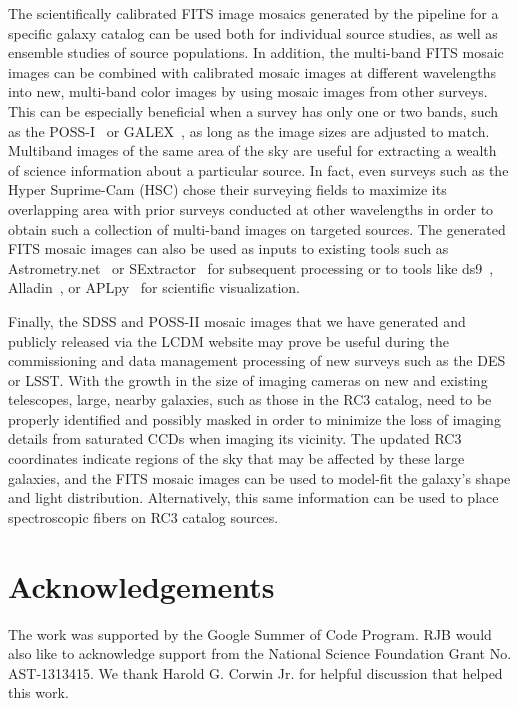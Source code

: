 \documentclass[authoryear, 12pt, 5p, times]{elsarticle}
\begin{document}
The scientifically calibrated FITS image mosaics generated by the pipeline for a specific galaxy catalog can be used both for individual source studies, as well as ensemble studies of source populations. In addition, the multi-band FITS mosaic images can be combined with calibrated mosaic images at different wavelengths into new, multi-band color images by using mosaic images from other surveys. This can be especially beneficial when a survey has only one or two bands, such as the POSS-I~\citep{poss1} or GALEX~\citep{galex}, as long as the image sizes are adjusted to match. Multiband images of the same area of the sky are useful for extracting a wealth of science information about a particular source. In fact, even surveys such as the Hyper Suprime-Cam (HSC) chose their surveying fields to maximize its overlapping area with prior surveys conducted at other wavelengths in order to obtain such a collection of multi-band images on targeted sources. The generated FITS mosaic images can also be used as inputs to existing tools such as Astrometry.net~\citep{astrometry.net} or SExtractor~\citep{sextractor} for subsequent processing or to tools like ds9~\citep{ds9}, Alladin~\citep{aladin}, or APLpy~\citep{aplpy} for scientific visualization.

Finally, the SDSS and POSS-II mosaic images that we have generated and publicly released via the LCDM website may prove be useful during the commissioning and data management processing of new surveys such as the DES or LSST. With the growth in the size of  imaging cameras on new and existing telescopes, large, nearby galaxies, such as those in the RC3 catalog, need to be properly identified and possibly masked in order to minimize the loss of imaging details from saturated CCDs when imaging its vicinity. The updated RC3 coordinates indicate regions of the sky that may be affected by these large galaxies, and the FITS mosaic images can be used to model-fit the galaxy's shape and light distribution. Alternatively, this same information can be used to place spectroscopic fibers on RC3 catalog sources. 

\section*{Acknowledgements}
\footnotesize

The work was supported by the Google Summer of Code Program. RJB would also like to acknowledge support from the National Science Foundation Grant No. AST-1313415. We thank Harold G. Corwin Jr. for helpful discussion that helped this work. 
\end{document}
